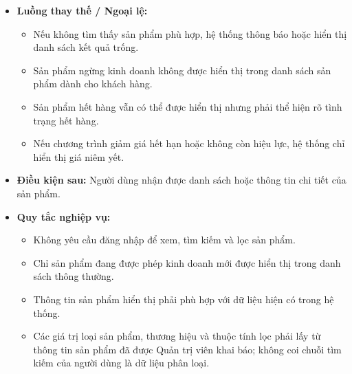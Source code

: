 \documentclass[12pt,a4paper]{article}
\begin{document}
\begin{itemize}
\begin{enumerate}
  \item Người dùng chọn một sản phẩm.

  \item Hệ thống hiển thị thông tin chi tiết của sản phẩm.

 \end{enumerate}

 \item \textbf{Luồng thay thế / Ngoại lệ:}

 \begin{itemize}

  \item Nếu không tìm thấy sản phẩm phù hợp, hệ thống thông báo hoặc hiển thị danh sách kết quả trống.

  \item Sản phẩm ngừng kinh doanh không được hiển thị trong danh sách sản phẩm dành cho khách hàng.

  \item Sản phẩm hết hàng vẫn có thể được hiển thị nhưng phải thể hiện rõ tình trạng hết hàng.

   \item Nếu chương trình giảm giá hết hạn hoặc không còn hiệu lực, hệ thống chỉ hiển thị giá niêm yết.

 \end{itemize}

 \item \textbf{Điều kiện sau:} Người dùng nhận được danh sách hoặc thông tin chi tiết của sản phẩm.

 \item \textbf{Quy tắc nghiệp vụ:}

 \begin{itemize}

  \item Không yêu cầu đăng nhập để xem, tìm kiếm và lọc sản phẩm.

  \item Chỉ sản phẩm đang được phép kinh doanh mới được hiển thị trong danh sách thông thường.

  \item Thông tin sản phẩm hiển thị phải phù hợp với dữ liệu hiện có trong hệ thống.

   \item Các giá trị loại sản phẩm, thương hiệu và thuộc tính lọc phải lấy từ thông tin sản phẩm đã được Quản trị viên khai báo; không coi chuỗi tìm kiếm của người dùng là dữ liệu phân loại.

 \end{itemize}

\end{itemize}
\end{document}

